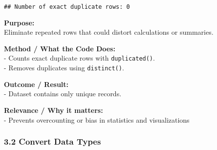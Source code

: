 \documentclass[
]{article}
\begin{document}
\begin{verbatim}
## Number of exact duplicate rows: 0
\end{verbatim}

\textbf{Purpose:}\\
Eliminate repeated rows that could distort calculations or summaries.

\textbf{Method / What the Code Does:}\\
- Counts exact duplicate rows with \texttt{duplicated()}.\\
- Removes duplicates using \texttt{distinct()}.

\textbf{Outcome / Result:}\\
- Dataset contains only unique records.

\textbf{Relevance / Why it matters:}\\
- Prevents overcounting or bias in statistics and visualizations

\subsubsection{3.2 Convert Data Types}\label{convert-data-types}
\end{document}
